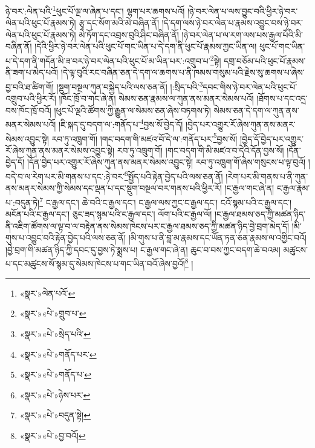 ཉེ་བར་:ལེན་པའི་\footnote{«སྣར་»ལེན་པའོ་}ཕུང་པོ་ལྔ་ལ་ཞེན་པ་དང་། ལྷག་པར་ཆགས་པའོ། །ཉེ་བར་ལེན་པ་ལས་བྱུང་བའི་ཕྱིར་ཉེ་བར་ལེན་པའི་ཕུང་པོ་རྣམས་ཏེ། རྩྭ་དང་སོག་མའི་མེ་བཞིན་ནོ། །དེ་དག་ལས་ཉེ་བར་ལེན་པ་རྣམས་འབྱུང་བས་ཉེ་བར་ལེན་པའི་ཕུང་པོ་རྣམས་ཏེ། མེ་ཏོག་དང་འབྲས་བུའི་ཤིང་བཞིན་ནོ། །ཉེ་བར་ལེན་པ་ལ་རག་ལས་པས་རྒྱལ་པོའི་མི་བཞིན་ནོ། །དེའི་ཕྱིར་ཉེ་བར་ལེན་པའི་ཕུང་པོ་གང་ཡིན་པ་དེ་དག་ནི་ཕུང་པོ་རྣམས་ཀྱང་ཡིན་ལ། ཕུང་པོ་གང་ཡིན་པ་དེ་དག་ནི་གདོན་མི་ཟ་བར་ཉེ་བར་ལེན་པའི་ཕུང་པོ་མ་ཡིན་པར་:འགྲུབ་པ་\footnote{«སྣར་»«པེ་»གྲུབ་པ་}སྟེ། དགྲ་བཅོམ་པའི་ཕུང་པོ་རྣམས་ནི་ཟག་པ་མེད་པའོ། །དེ་ལྟ་བུའི་རང་བཞིན་ཅན་དེ་དག་ལ་ཆགས་པ་ནི་ཁམས་གསུམ་པའི་རྗེས་སུ་ཆགས་པ་ཞེས་བྱ་བའི་ཐ་ཚིག་གོ། །སྡུག་བསྔལ་ཀུན་བསྐྱེད་པའི་ལས་ཅན་ནོ། །:སྲིད་པའི་\footnote{«སྣར་»«པེ་»སྲེད་པའི་}དབང་གིས་ཉེ་བར་ལེན་པའི་ཕུང་པོ་འགྲུབ་པའི་ཕྱིར་རོ། །ཁོང་ཁྲོ་བ་གང་ཞེ་ན། སེམས་ཅན་རྣམས་ལ་ཀུན་ནས་མནར་སེམས་པའོ། །ཐོགས་པ་དང་འདྲ་བས་ཁོང་ཁྲོ་བའོ། །ཕུང་པོ་ལྔའི་ཚོགས་ཀྱི་རྒྱུན་ལ་སེམས་ཅན་ཞེས་བཏགས་ཏེ། སེམས་ཅན་དེ་དག་ལ་ཀུན་ནས་མནར་སེམས་པའོ། །ཇི་སྐད་དུ་བདག་ལ་:གནོད་པ་\footnote{«སྣར་»«པེ་»གནོད་པར་}བྱས་སོ་བྱེད་དོ། །བྱེད་པར་འགྱུར་རོ་ཞེས་ཀུན་ནས་མནར་སེམས་འབྱུང་སྟེ། རབ་ཏུ་འཁྲུག་གོ། །གང་བདག་གི་མཛའ་བོ་དེ་ལ་:གནོད་པར་\footnote{«སྣར་»«པེ་»གནོད་པ་}བྱས་སོ། །བྱེད་དོ་བྱེད་པར་འགྱུར་རོ་ཞེས་ཀུན་ནས་མནར་སེམས་འབྱུང་སྟེ། རབ་ཏུ་འཁྲུག་གོ། །གང་བདག་གི་མི་མཛའ་བ་དེའི་དོན་བྱས་སོ། །དོན་བྱེད་དོ། །དོན་བྱེད་པར་འགྱུར་རོ་ཞེས་ཀུན་ནས་མནར་སེམས་འབྱུང་སྟེ། རབ་ཏུ་འཁྲུག་གོ་ཞེས་གསུངས་པ་ལྟ་བུའོ། །བདེ་བ་ལ་རེག་པར་མི་གནས་པ་དང་:ཉེ་བར་\footnote{«སྣར་»«པེ་»ཉེས་པར་}སྤྱོད་པའི་རྟེན་བྱེད་པའི་ལས་ཅན་ནོ། །རེག་པར་མི་གནས་པ་ནི་ཀུན་ནས་མནར་སེམས་ཀྱི་སེམས་དང་ལྡན་པ་དང་སྡུག་བསྔལ་བར་གནས་པའི་ཕྱིར་རོ། །ང་རྒྱལ་གང་ཞེ་ན། ང་རྒྱལ་རྣམ་པ་:བདུན་ཏེ།\footnote{«སྣར་»«པེ་»བདུན་སྟེ།} ང་རྒྱལ་དང་། ཆེ་བའི་ང་རྒྱལ་དང་། ང་རྒྱལ་ལས་ཀྱང་ང་རྒྱལ་དང་། ངའོ་སྙམ་པའི་ང་རྒྱལ་དང་། མངོན་པའི་ང་རྒྱལ་དང་། ཅུང་ཟད་སྙམ་པའི་ང་རྒྱལ་དང་། ལོག་པའི་ང་རྒྱལ་ལོ། །ང་རྒྱལ་ཐམས་ཅད་ཀྱི་མཚན་ཉིད་ནི་འཇིག་ཚོགས་ལ་ལྟ་བ་ལ་བརྟེན་ནས་སེམས་ཁེངས་པར་ང་རྒྱལ་ཐམས་ཅད་ཀྱི་མཚན་ཉིད་བྱེ་བྲག་མེད་དོ། །མི་གུས་པ་འབྱུང་བའི་རྟེན་བྱེད་པའི་ལས་ཅན་ནོ། །མི་གུས་པ་ནི་བླ་མ་རྣམས་དང་ཡོན་ཏན་ཅན་རྣམས་ལ་འགྱིང་བའོ། །བྱེ་བྲག་གི་མཚན་ཉིད་ཀྱི་དབང་དུ་བྱས་ཏེ་སྨྲས་པ། ང་རྒྱལ་གང་ཞེ་ན། ཆུང་བ་བས་ཀྱང་བདག་ཆེ་བའམ། མཚུངས་པ་དང་མཚུངས་སོ་སྙམ་དུ་སེམས་ཁེངས་པ་གང་ཡིན་བའོ་ཞེས་བྱའོ།\footnote{«སྣར་»«པེ་»བྱ་བའོ།} །
